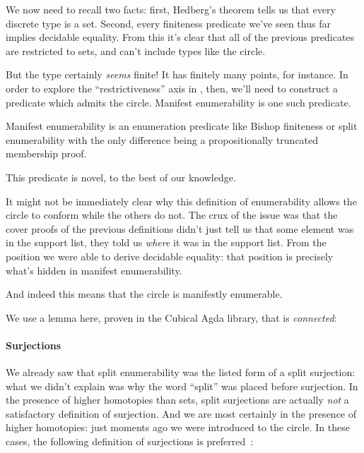 We now need to recall two facts: first, Hedberg's theorem tells us that every
discrete type is a set.
Second, every finiteness predicate we've seen thus far implies decidable
equality.
From this it's clear that all of the previous predicates are restricted to sets,
and can't include types like the circle.

But the type certainly \emph{seems} finite!
It has finitely many points, for instance.
In order to explore the ``restrictiveness'' axis in
, then, we'll need to construct a predicate
which admits the circle.
Manifest enumerability is one such predicate.
\begin{definition}
  Manifest enumerability is an enumeration predicate like Bishop finiteness or
  split enumerability with the only difference being a propositionally truncated
  membership proof.
  
  
\end{definition}
This predicate is novel, to the best of our knowledge.

It might not be immediately clear why this definition of enumerability allows
the circle to conform while the others do not.
The crux of the issue was that the cover proofs of the previous definitions
didn't just tell us that some element was in the support list, they told us
\emph{where} it was in the support list.
From the position we were able to derive decidable equality: that position is
precisely what's hidden in manifest enumerability.

And indeed this means that the circle is manifestly enumerable.


We use a lemma here, proven in the Cubical Agda library, that
 is \emph{connected}:


\paragraph{Surjections}
We already saw that split enumerability was the listed form of a split
surjection: what we didn't explain was why the word ``split'' was placed before
surjection.
In the presence of higher homotopies than sets, split surjections are actually
\emph{not} a satisfactory definition of surjection.
And we are most certainly in the presence of higher homotopies: just moments ago
we were introduced to the circle.
In these cases, the following definition of surjections is
preferred~\cite[definition 4.6.1]{hottbook}:
\begin{agdalisting}\label{surj-eqn}
  \begin{multicols}{2}
     \columnbreak
  \end{multicols}
\end{agdalisting}

